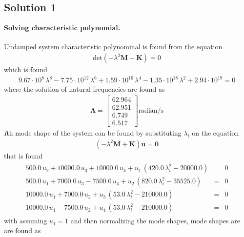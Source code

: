 \documentclass[]{report}
\begin{document}
\begin{center}
\subsection*{Solution 1}
\end{center}
\textbf{Solving characteristic polynomial.}\\~\\
Undamped system characteristic polynominal is found from the equation
\begin{eqnarray*}
\mathrm{det}\left(-\lambda^2\mathbf{M}+ \mathbf{K}\right)=0
\end{eqnarray*}
which is found 
\begin{eqnarray*}
9.67\cdot 10^8\, \lambda^8 - 7.75\cdot 10^{12}\, \lambda^6 + 1.59\cdot 10^{16}\, \lambda^4 - 1.35\cdot 10^{18}\, \lambda^2 + 2.94\cdot 10^{19}=0
\end{eqnarray*}
where the solution of natural frequencies are found as
\begin{eqnarray*}
{\mathbf{\Lambda}}=\left[\begin{array}{c} 62.964\\ 62.951\\ 6.749\\6.517 \end{array}\right]\mathrm{radian/s}
\end{eqnarray*}
\emph{I}th mode shape of the system can be found by substituting $\lambda_i$ on the equation 
\begin{eqnarray*}
\left(-\lambda^2\mathbf{M}+ \mathbf{K}\right)\mathbf{u}=\mathbf{0}
\end{eqnarray*}
that is found 
\begin{eqnarray*}
\begin{array}{ccc} 500.0\, u_{2} + 10000.0\, u_{3} + 10000.0\, u_{4} + u_{1}\, \left(420.0\, \lambda_i^2 - 20000.0\right)&=& 0\\ 500.0\, u_{1} + 7000.0\, u_{3} - 7500.0\, u_{4} + u_{2}\, \left(820.0\, \lambda_i^2 - 35525.0\right)&=& 0\\ 10000.0\, u_{1} + 7000.0\, u_{2} + u_{3}\, \left(53.0\, \lambda_i^2 - 210000.0\right)&=& 0\\ 10000.0\, u_{1} - 7500.0\, u_{2} + u_{4}\, \left(53.0\, \lambda_i^2 - 210000.0\right)&=& 0 \end{array}
\end{eqnarray*}
with assuming $u_1=1$ and then normalizing the mode shapes, mode shapes are are found as\\~\\
\end{document}
